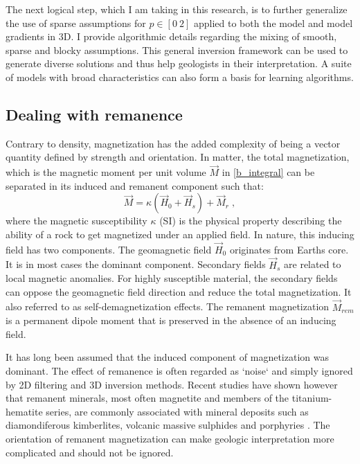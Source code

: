 The next logical step, which I am taking in this research, is to further generalize the use of sparse assumptions for $p \in[0\:2]$ applied to both the model and model gradients in 3D. I provide algorithmic details regarding the mixing of smooth, sparse and blocky assumptions. This general inversion framework can be used to generate diverse solutions and thus help geologists in their interpretation. A suite of models with broad characteristics can also form a basis for learning algorithms.

\subsection{Dealing with remanence}
Contrary to density, magnetization has the added complexity of being a vector quantity defined by strength and orientation.
In matter, the total magnetization, which is the magnetic moment per unit volume $\vec{M}$ in \eqref{b_integral} can be separated in its induced and remanent component such that:
\begin{equation}\label{Magnetization}
	\vec{M} = \kappa (\vec{H}_0 + \vec{H}_s) + \vec{M}_{r}\;,
\end{equation}
where the magnetic susceptibility $\kappa$ (SI) is the physical property describing the ability of a rock to get magnetized under an applied field. In nature, this inducing field has two components. The geomagnetic field $\vec{H}_0$ originates from Earth\textsc{}s core. It is in most cases the dominant component. Secondary fields $\vec{H}_s$ are related to local magnetic anomalies. For highly susceptible material, the secondary fields can oppose the geomagnetic field direction and reduce the total magnetization. It also referred to as self-demagnetization effects.
The remanent magnetization $\vec{M}_{rem}$ is a permanent dipole moment that is preserved in the absence of an inducing field.

It has long been assumed that the induced component of magnetization was dominant. The effect of remanence is often regarded as `noise` and simply ignored by 2D filtering and 3D inversion methods. Recent studies have shown however that remanent minerals, most often magnetite and members of the titanium-hematite series, are commonly associated with mineral deposits such as diamondiferous kimberlites, volcanic massive sulphides and porphyries \cite[]{Henkel1991, Enkin2014}. The orientation of remanent magnetization can make geologic interpretation more complicated and should not be ignored.

